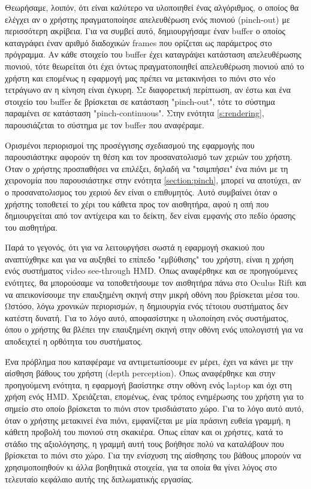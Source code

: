 Θεωρήσαμε, λοιπόν, ότι είναι καλύτερο να υλοποιηθεί ένας αλγόριθμος, ο οποίος θα ελέγχει αν ο χρήστης πραγματοποίησε απελευθέρωση ενός πιονιού (pinch-out) με περισσότερη ακρίβεια. Για να συμβεί αυτό, δημιουργήσαμε έναν buffer ο οποίος καταγράφει έναν αριθμό διαδοχικών frames που ορίζεται ως παράμετρος στο πρόγραμμα. Αν κάθε στοιχείο του buffer έχει καταγράψει κατάσταση απελευθέρωσης πιονιού, τότε θεωρείται ότι έχει όντως πραγματοποιηθεί απελευθέρωση πιονιού από το χρήστη και επομένως η εφαρμογή μας πρέπει να μετακινήσει το πιόνι στο νέο τετράγωνο αν η κίνηση είναι έγκυρη. Σε διαφορετική περίπτωση, αν έστω και ένα στοιχείο του buffer δε βρίσκεται σε κατάσταση "pinch-out", τότε το σύστημα παραμένει σε κατάσταση "pinch-continuous". Στην ενότητα \ref{s:rendering}, παρουσιάζεται το σύστημα με τον buffer που αναφέραμε. 



Ορισμένοι περιορισμοί της προσέγγισης σχεδιασμού της εφαρμογής που παρουσιάστηκε αφορούν τη θέση και τον προσανατολισμό των χεριών του χρήστη. Όταν ο χρήστης προσπαθήσει να επιλέξει, δηλαδή να "τσιμπήσει" ένα πιόνι με τη χειρονομία που παρουσιάστηκε στην ενότητα \ref{section:pinch}, μπορεί να αποτύχει, αν ο προσανατολισμος του χεριού δεν είναι ο επιθυμητός. Αυτό συμβαίνει όταν ο χρήστης τοποθετεί το χέρι του κάθετα προς τον αισθητήρα, αφού η οπή που δημιουργείται από τον αντίχειρα και το δείκτη, δεν είναι εμφανής στο πεδίο όρασης του αισθητήρα.




Παρά το γεγονός, ότι για να λειτουργήσει σωστά η εφαρμογή σκακιού που αναπτύχθηκε και για να αυξηθεί το επίπεδο "εμβύθισης" του χρήστη, είναι η χρήση ενός συστήματος video see-through HMD. Όπως αναφέρθηκε και σε προηγούμενες ενότητες, θα μπορούσαμε να τοποθετήσουμε τον αισθητήρα πάνω στο Oculus Rift και να απεικονίσουμε την επαυξημένη σκηνή στην μικρή οθόνη που βρίσκεται μέσα του. Ωστόσο, λόγω χρονικών περιορισμών, η δημιουργία ενός τέτοιου συστήματος δεν κατέστη δυνατή. Για το λόγο αυτό, αποφασίστηκε η υλοποίηση ενός συστήματος, όπου ο χρήστης θα βλέπει την επαυξημένη σκηνή στην οθόνη ενός υπολογιστή για να αποδειχτεί η ορθότητα του συστήματος. 


Ένα πρόβλημα που καταφέραμε να αντιμετωπίσουμε εν μέρει, έχει να κάνει με την αίσθηση βάθους του χρήστη (depth perception). Όπως αναφέρθηκε και στην προηγούμενη ενότητα, η εφαρμογή βασίστηκε στην οθόνη ενός laptop και όχι στη χρήση ενός HMD. Χρειάζεται, επομένως, ένας τρόπος ενημέρωσης του χρήστη για το σημείο στο οποίο βρίσκεται το πιόνι στον τρισδιάστατο χώρο. Για το λόγο αυτό αυτό, όταν ο χρήστης μετακινεί ένα πιόνι, εμφανίζεται με μία πράσινη ευθεία γραμμή, η κάθετη προβολή του πιονιού στη σκακιέρα. Όπως είπαν και οι χρήστες, κατά το στάδιο της αξιολόγησης, η γραμμή αυτή τους βοήθησε πολύ να καταλάβουν που βρίσκεται το πιόνι στο χώρο. Για την ενίσχυση της αίσθησης του βάθους μπορούν να χρησιμοποιηθούν κι άλλα βοηθητικά στοιχεία, για τα οποία θα γίνει λόγος στο τελευταίο κεφάλαιο αυτής της διπλωματικής εργασίας.



